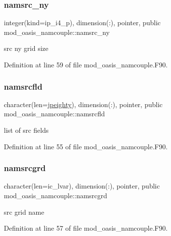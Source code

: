 \subsubsection{\texorpdfstring{namsrc\+\_\+ny}{namsrc\_ny}}
{\footnotesize\ttfamily integer(kind=ip\+\_\+i4\+\_\+p), dimension(\+:), pointer, public mod\+\_\+oasis\+\_\+namcouple\+::namsrc\+\_\+ny}



src ny grid size 



Definition at line 59 of file mod\+\_\+oasis\+\_\+namcouple.\+F90.

\mbox{\label{namespacemod__oasis__namcouple_a5fcb5a4f2a49f414fafe38b03c5c089d}} 
\subsubsection{\texorpdfstring{namsrcfld}{namsrcfld}}
{\footnotesize\ttfamily character(len=\hyperlink{namespacemod__oasis__namcouple_a4fb10ad6e864dcbe34c4a8b02204a523}{jpeighty}), dimension(\+:), pointer, public mod\+\_\+oasis\+\_\+namcouple\+::namsrcfld}



list of src fields 



Definition at line 55 of file mod\+\_\+oasis\+\_\+namcouple.\+F90.

\mbox{\label{namespacemod__oasis__namcouple_a589c1bae58b10bcb0cfb30c0893a7895}} 
\subsubsection{\texorpdfstring{namsrcgrd}{namsrcgrd}}
{\footnotesize\ttfamily character(len=ic\+\_\+lvar), dimension(\+:), pointer, public mod\+\_\+oasis\+\_\+namcouple\+::namsrcgrd}



src grid name 



Definition at line 57 of file mod\+\_\+oasis\+\_\+namcouple.\+F90.

